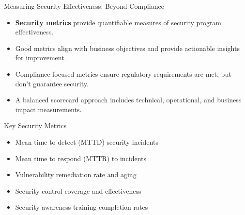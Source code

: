 \documentclass{beamer}
\begin{document}
                            \begin{frame}{Measuring Security Effectiveness: Beyond Compliance}
                            \begin{itemize}
                                \item \textbf{Security metrics} provide quantifiable measures of security program effectiveness.
                                \item Good metrics align with business objectives and provide actionable insights for improvement.
                                \item Compliance-focused metrics ensure regulatory requirements are met, but don't guarantee security.
                                \item A balanced scorecard approach includes technical, operational, and business impact measurements.
                            \end{itemize}
                            
                            \begin{alertblock}{Key Security Metrics}
                            \begin{itemize}
                                \item Mean time to detect (MTTD) security incidents
                                \item Mean time to respond (MTTR) to incidents
                                \item Vulnerability remediation rate and aging
                                \item Security control coverage and effectiveness
                                \item Security awareness training completion rates
                            \end{itemize}
                            \end{alertblock}
                            \end{frame}
                            
\end{document}

